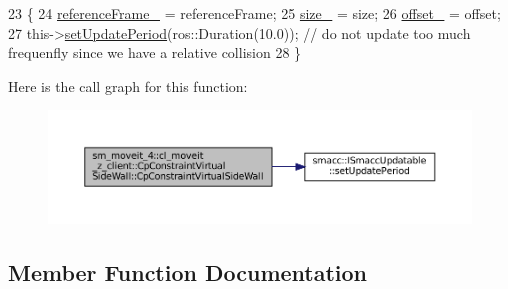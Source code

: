 \begin{DoxyCode}
23         \{
24             \hyperlink{classsm__moveit__4_1_1cl__moveit__z__client_1_1CpConstraintVirtualSideWall_a0b43e5e3942efb3498a919accffbc3cc}{referenceFrame\_} = referenceFrame;
25             \hyperlink{classsm__moveit__4_1_1cl__moveit__z__client_1_1CpConstraintVirtualSideWall_ae249e70499ae591a06d24b9b9877d3c6}{size\_} = size;
26             \hyperlink{classsm__moveit__4_1_1cl__moveit__z__client_1_1CpConstraintVirtualSideWall_acefab4905c8cb5f72122c84310cfeb7c}{offset\_} = offset;
27             this->\hyperlink{classsmacc_1_1ISmaccUpdatable_a88f3b092a81b2d8810a9776c8c69855b}{setUpdatePeriod}(ros::Duration(10.0)); \textcolor{comment}{// do not update too much frequenfly
       since we have a relative collision}
28         \}
\end{DoxyCode}
Here is the call graph for this function\+:
\nopagebreak
\begin{figure}[H]
\begin{center}
\leavevmode
\includegraphics[width=350pt]{classsm__moveit__4_1_1cl__moveit__z__client_1_1CpConstraintVirtualSideWall_a500307e89d0343f1679d25a7f8fb40ce_cgraph}
\end{center}
\end{figure}


\subsection{Member Function Documentation}
\mbox{\label{classsm__moveit__4_1_1cl__moveit__z__client_1_1CpConstraintVirtualSideWall_a9f08de3e14d64a3b23e32c255cf67b4d}} 
